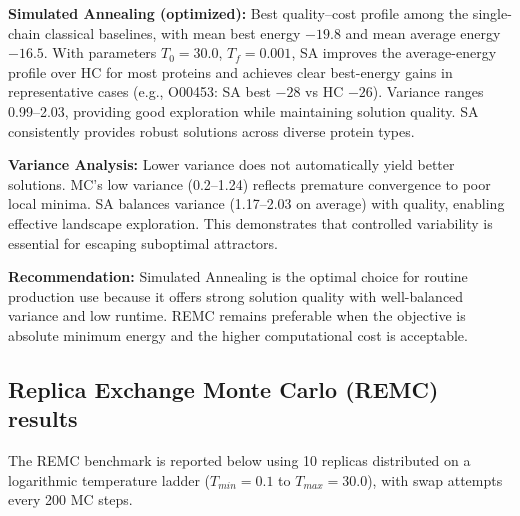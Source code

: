 \textbf{Simulated Annealing (optimized):} Best quality--cost profile among the single-chain classical baselines, with mean best energy $-19.8$ and mean average energy $-16.5$. With parameters $T_0 = 30.0$, $T_f = 0.001$, SA improves the average-energy profile over HC for most proteins and achieves clear best-energy gains in representative cases (e.g., O00453: SA best $-28$ vs HC $-26$). Variance ranges 0.99--2.03, providing good exploration while maintaining solution quality. SA consistently provides robust solutions across diverse protein types.

\textbf{Variance Analysis:} Lower variance does not automatically yield better solutions. MC's low variance (0.2--1.24) reflects premature convergence to poor local minima. SA balances variance (1.17--2.03 on average) with quality, enabling effective landscape exploration. This demonstrates that controlled variability is essential for escaping suboptimal attractors.

\textbf{Recommendation:} Simulated Annealing is the optimal choice for routine production use because it offers strong solution quality with well-balanced variance and low runtime. REMC remains preferable when the objective is absolute minimum energy and the higher computational cost is acceptable.
\FloatBarrier

\subsection{Replica Exchange Monte Carlo (REMC) results}
\label{cap4:subsec_remc_results}

The REMC benchmark is reported below using 10 replicas distributed on a logarithmic temperature ladder ($T_{min} = 0.1$ to $T_{max} = 30.0$), with swap attempts every 200 MC steps.

